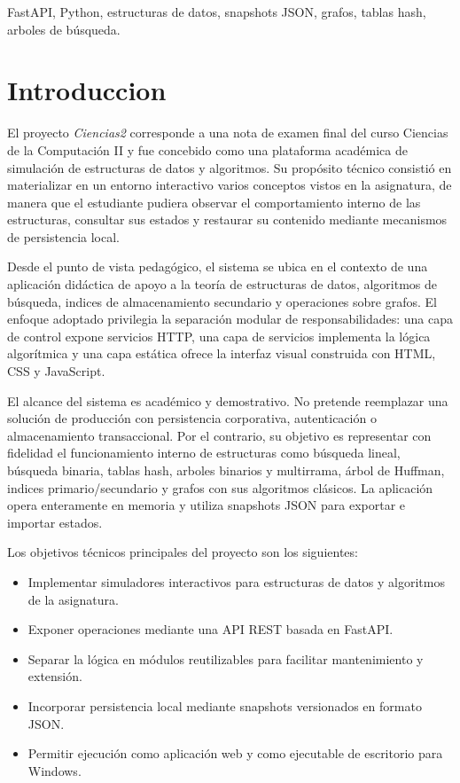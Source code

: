 \documentclass[12pt,onecolumn]{IEEEtran}
\begin{document}
\begin{IEEEkeywords}
FastAPI, Python, estructuras de datos, snapshots JSON, grafos, tablas hash, arboles de búsqueda.
\end{IEEEkeywords}

\newpage

\tableofcontents


\newpage

\section{Introduccion}
El proyecto \textit{Ciencias2} corresponde a una nota de examen final del curso Ciencias de la Computación II y fue concebido como una plataforma académica de simulación de estructuras de datos y algoritmos. Su propósito técnico consistió en materializar en un entorno interactivo varios conceptos vistos en la asignatura, de manera que el estudiante pudiera observar el comportamiento interno de las estructuras, consultar sus estados y restaurar su contenido mediante mecanismos de persistencia local.

Desde el punto de vista pedagógico, el sistema se ubica en el contexto de una aplicación didáctica de apoyo a la teoría de estructuras de datos, algoritmos de búsqueda, indices de almacenamiento secundario y operaciones sobre grafos. El enfoque adoptado privilegia la separación modular de responsabilidades: una capa de control expone servicios HTTP, una capa de servicios implementa la lógica algorítmica y una capa estática ofrece la interfaz visual construida con HTML, CSS y JavaScript.

El alcance del sistema es académico y demostrativo. No pretende reemplazar una solución de producción con persistencia corporativa, autenticación o almacenamiento transaccional. Por el contrario, su objetivo es representar con fidelidad el funcionamiento interno de estructuras como búsqueda lineal, búsqueda binaria, tablas hash, arboles binarios y multirrama, árbol de Huffman, indices primario/secundario y grafos con sus algoritmos clásicos. La aplicación opera enteramente en memoria y utiliza snapshots JSON para exportar e importar estados.

Los objetivos técnicos principales del proyecto son los siguientes:
\begin{itemize}
  \item Implementar simuladores interactivos para estructuras de datos y algoritmos de la asignatura.
  \item Exponer operaciones mediante una API REST basada en FastAPI.
  \item Separar la lógica en módulos reutilizables para facilitar mantenimiento y extensión.
  \item Incorporar persistencia local mediante snapshots versionados en formato JSON.
  \item Permitir ejecución como aplicación web y como ejecutable de escritorio para Windows.
\end{itemize}
\end{document}
